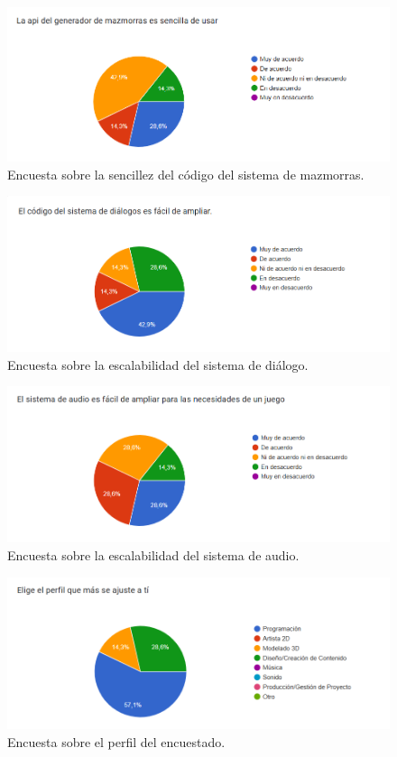 \begin{figure}[H]
  \centering
  \includegraphics[width=450px,clip=true]{CUESTIONARIO_15.png}
  \caption{Encuesta sobre la sencillez del código del sistema de mazmorras.}
  \label{fig:CUESTIONARIO_15trucado}
\end{figure}
\raggedbottom

\begin{figure}[H]
  \centering
  \includegraphics[width=450px,clip=true]{CUESTIONARIO_3.png}
  \caption{Encuesta sobre la escalabilidad del sistema de diálogo.}
  \label{fig:CUESTIONARIO_3trucado}
\end{figure}
\raggedbottom

\begin{figure}[H]
  \centering
  \includegraphics[width=450px,clip=true]{CUESTIONARIO_6.png}
  \caption{Encuesta sobre la escalabilidad del sistema de audio.}
  \label{fig:CUESTIONARIO_6trucado}
\end{figure}
\raggedbottom

\begin{figure}[H]
  \centering
  \includegraphics[width=450px,clip=true]{CUESTIONARIO_32.png}
  \caption{Encuesta sobre el perfil del encuestado.}
  \label{fig:CUESTIONARIO_32trucado}
\end{figure}
\raggedbottom

